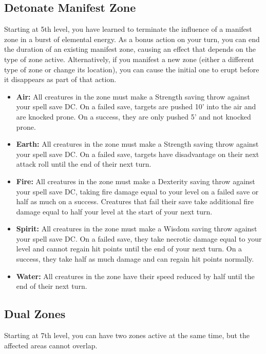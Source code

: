 \subsection{Detonate Manifest Zone}
Starting at 5th level, you have learned to terminate the influence of a manifest zone in a burst of elemental energy. As a bonus action on your turn, you can end the duration of an existing manifest zone, causing an effect that depends on the type of zone active. Alternatively, if you manifest a new zone (either a different type of zone or change its location), you can cause the initial one to erupt before it disappears as part of that action.
\begin{itemize}
  \item \textbf{Air:} All creatures in the zone must make a Strength saving throw against your spell save DC. On a failed save, targets are pushed 10' into the air and are knocked prone. On a success, they are only pushed 5' and not knocked prone.
  \item \textbf{Earth:} All creatures in the zone must make a Strength saving throw against your spell save DC. On a failed save, targets have disadvantage on their next attack roll until the end of their next turn.
  \item \textbf{Fire:} All creatures in the zone must make a Dexterity saving throw against your spell save DC, taking fire damage equal to your level on a failed save or half as much on a success. Creatures that fail their save take additional fire damage equal to half your level at the start of your next turn.
  \item \textbf{Spirit:} All creatures in the zone must make a Wisdom saving throw against your spell save DC. On a failed save, they take necrotic damage equal to your level and cannot regain hit points until the end of your next turn. On a success, they take half as much damage and can regain hit points normally.
  \item \textbf{Water:} All creatures in the zone have their speed reduced by half until the end of their next turn.
\end{itemize}

\subsection{Dual Zones}
Starting at 7th level, you can have two zones active at the same time, but the affected areas cannot overlap.

